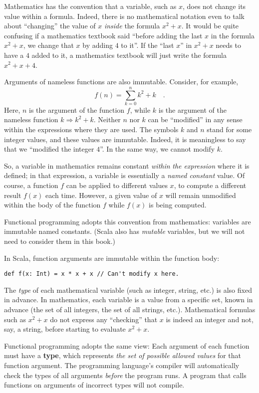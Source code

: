 Mathematics has the convention that a variable, such as $x$, does
not change its value within a formula. Indeed, there is no mathematical
notation even to talk about ``changing'' the value of $x$ \emph{inside}
the formula $x^{2}+x$. It would be quite confusing if a mathematics
textbook said ``before adding the last $x$ in the formula $x^{2}+x$,
we change that $x$ by adding $4$ to it''. If the ``last $x$''
in $x^{2}+x$ needs to have a $4$ added to it, a mathematics textbook
will just write the formula $x^{2}+x+4$.

Arguments of nameless functions are also immutable. Consider, for
example,
\[
f(n)=\sum_{k=0}^{n}k^{2}+k\quad.
\]
Here, $n$ is the argument of the function $f$, while $k$ is the
argument of the nameless function $k\Rightarrow k^{2}+k$. Neither
$n$ nor $k$ can be ``modified'' in any sense within the expressions
where they are used. The symbols $k$ and $n$ stand for some integer
values, and these values are immutable. Indeed, it is meaningless
to say that we ``modified the integer $4$''. In the same way, we
cannot modify $k$.

So, a variable in mathematics remains constant \emph{within} \emph{the
expression} where it is defined; in that expression, a variable is
essentially a \emph{named constant} value. Of course, a function $f$
can be applied to different values $x$, to compute a different result
$f(x)$ each time. However, a given value of $x$ will remain unmodified
within the body of the function $f$ while $f(x)$ is being computed.

Functional programming adopts this convention from mathematics: variables
are immutable named constants. (Scala also has \emph{mutable} variables,
but we will not need to consider them in this book.)

In Scala, function arguments are immutable within the function body:
\begin{lstlisting}
def f(x: Int) = x * x + x // Can't modify x here.
\end{lstlisting}
The \emph{type} of each mathematical variable (such as integer, string,
etc.) is also fixed in advance. In mathematics, each variable is a
value from a specific set, known in advance (the set of all integers,
the set of all strings, etc.). Mathematical formulas such as $x^{2}+x$
do not express any ``checking'' that $x$ is indeed an integer and
not, say, a string, before starting to evaluate $x^{2}+x$.

Functional programming adopts the same view: Each argument of each
function must have a \textbf{type}, which represents
\emph{the set of possible allowed values} for that function argument.
The programming language's compiler will automatically check the types
of all arguments \emph{before} the program runs. A program that calls
functions on arguments of incorrect types will not compile.

